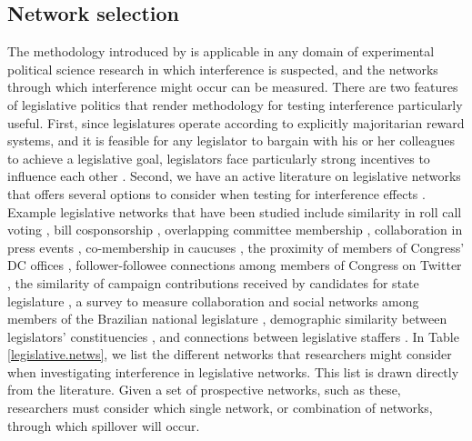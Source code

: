 \documentclass[12pt]{article}
\begin{document}
 \subsection{Network selection}
The methodology introduced by \citet{bowers2012reasoning} is applicable in any domain of experimental political science research in which interference is suspected, and the networks through which interference might occur can be measured.  There are two features of legislative politics that render methodology for testing interference particularly useful. First, since legislatures operate according to explicitly majoritarian reward systems, and it is feasible for any legislator to bargain with his or her colleagues to achieve a legislative goal, legislators face particularly strong incentives to influence each other \citep{matthews1959folkways,ferejohn1986logrolling,bernhard2013commitment}. Second, we have an active literature on legislative networks that offers several options to consider when testing for interference effects \citep{kirkland2014measurement,desmarais2015measuring}. Example legislative networks that have been studied include similarity in roll call voting \citep{kim2012comparing}, bill cosponsorship \citep{fowler2006connecting}, overlapping committee membership \citep{porter2005network}, collaboration in press events \citep{desmarais2015measuring}, co-membership in caucuses \citep{victor2009social}, the proximity of members of Congress' DC offices \citep{rogowski2012estimating}, follower-followee connections among members of Congress on Twitter \citep{peng2016follower}, the similarity of campaign contributions received by candidates for state legislature \citep{masket2015polarization}, a survey to measure collaboration and social networks among members of the Brazilian national legislature \citep{wojcik2017legislative}, demographic similarity between legislators' constituencies \citep{bratton2011networks}, and connections between legislative staffers \citep{ringe2013keeping}.  In Table \ref{legislative.netws}, we list the different networks that researchers might consider when investigating interference in legislative networks. This list is drawn directly from the literature. Given a set of prospective networks, such as these, researchers must consider which single network, or combination of networks, through which spillover will occur. 
\end{document}
